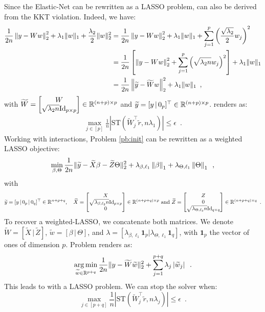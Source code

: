 \documentclass[../main.tex]{subfiles}
\begin{document}
Since the Elastic-Net can be rewritten as a LASSO problem,
 can also be derived from the KKT violation.
Indeed, we have:
\begin{align*}
	\frac{1}{2n}\left \lVert y-Ww \right \rVert_2^2 + \lambda_1 \|w\|_1 +
								  \frac{\lambda_2}{2}\|w\|^2_2
	& = \frac{1}{2n}\left \lVert y-Ww \right \rVert_2^2 + \lambda_1 \|w\|_1 +
         \sum_{j=1}^p\left(\frac{\sqrt{\lambda_2}}{2}w_j\right)^2 \\
	& = \frac{1}{2n}\left[\left \lVert y-Ww \right \rVert_2^2 +
	    \sum_{j=1}^p\left(\sqrt{\lambda_2 n}w_j\right)^2\right]
		+ \lambda_1 \|w\|_1  \\
	& = \frac{1}{2n}\left \lVert \widetilde y - \widetilde Ww \right \rVert_2^2
		+ \lambda_1 \|w\|_1
		\enspace,
\end{align*}
with $\widetilde W =
\begin{bmatrix} W \\
	 \sqrt{\lambda_2 n}\mathrm{Id}_{p\times p}
	\end{bmatrix} \in \mathbb{R}^{(n+p)\times p}$ and
$\widetilde y = [y \,|\, 0_p ]^\top\in\mathbb{R}^{(n+p)\times p}$.
 renders as:
\begin{align}
\max_{j\in [p]}  \frac{1}{n}
\left|\mathrm{ST}\left(\widetilde W_j^\top\widetilde r,
			 n\lambda_1 \right)\right|\leq \epsilon\enspace.
\end{align}
Working with interactions, Problem \eqref{pb:init} can be rewritten as
a weighted LASSO objective:
\[\min_{\beta, \Theta}\frac{1}{2n} \|\widetilde y -
		\widetilde X \beta - \widetilde Z\Theta\|_2^2 +
		\lambda_{\beta, \ell_1} \left \lVert \beta \right \rVert_1 +
		\lambda_{\Theta, \ell_1} \left \lVert \Theta \right \rVert_1\enspace,\]
with
\begin{align*}
	\widetilde y=[y\,|\, 0_p \,|\, 0_q]^\top \in \mathbb{R}^{n+p+q},
	\quad
	\widetilde X =
	\begin{bmatrix} X \\
		\sqrt{\lambda_{\beta, \ell_2} n}\mathrm{Id}_{p\times p}\\
		 0 \end{bmatrix}\in \mathbb{R}^{(n+p+q)\times p}
	\text{ and }
	\widetilde Z =
	\begin{bmatrix} Z \\
		 0 \\
		  \sqrt{\lambda_{\Theta, \ell_2} n}\mathrm{Id}_{q\times q}
		\end{bmatrix}\in\mathbb{R}^{(n+p+q)\times q}
		\enspace.
\end{align*}
To recover a weighted-LASSO, we concatenate both matrices.
We denote $\widetilde W = [\widetilde X \,|\, \widetilde Z]$,
$\widetilde w = [\beta \,|\, \Theta]$,
and $\lambda=[\lambda_{\beta, \ell_1}\mathbf{1}_p|
\lambda_{\Theta, \ell_1}\mathbf{1}_q]$, with $\mathbf{1}_p$ the vector of
ones of dimension $p$.
Problem  renders as:
\[\mathop{\mathrm{arg\,min}}_{\widetilde w \in \mathbb{R}^{p+q}}
  \frac{1}{2n} \| y - \widetilde W \widetilde w\|_2^2
  + \sum_{j=1}^{p+q} \lambda_j \left \vert \widetilde w_j \right \vert
  \enspace.\]
This leads to  with a LASSO problem.
We can stop the solver when:
\[\max_{j\in [p+q]} \frac{1}{n} \left| \mathrm{ST}\left( \widetilde W_j^\top \widetilde r, n\lambda_j\right)\right|\leq \epsilon\enspace. \]
\end{document}
